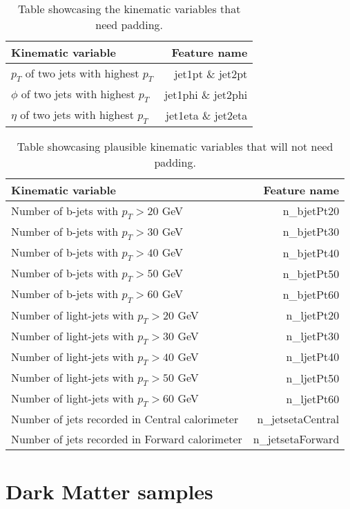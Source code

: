 \documentclass[14pt, a4paper]{book}
\begin{document}
\begin{table}[!h]
    \centering
    \begin{tabular}{l|r}\midrule\midrule
        Kinematic variable                                                  & Feature name          \\\midrule
        $p_T$ of two jets with highest $p_T$                                & jet1pt \& jet2pt\\
        $\phi$ of two jets with highest $p_T$                               & jet1phi \& jet2phi\\
        $\eta$ of two jets with highest $p_T$                               & jet1eta \& jet2eta\\
    \end{tabular}
    \caption[Kinematic variables that need padding]{Table showcasing the kinematic variables that need padding.}
    \label{tab:paddable_variables}
\end{table}

\begin{table}[!h]
    \centering
    \begin{tabular}{l|r}\midrule\midrule
        Kinematic variable                              & Feature name          \\\midrule
        Number of b-jets with $p_T > 20$ GeV            & n\_bjetPt20\\
        Number of b-jets with $p_T > 30$ GeV            & n\_bjetPt30\\
        Number of b-jets with $p_T > 40$ GeV            & n\_bjetPt40\\
        Number of b-jets with $p_T > 50$ GeV            & n\_bjetPt50\\
        Number of b-jets with $p_T > 60$ GeV            & n\_bjetPt60\\
        Number of light-jets with $p_T > 20$ GeV        & n\_ljetPt20\\
        Number of light-jets with $p_T > 30$ GeV        & n\_ljetPt30\\
        Number of light-jets with $p_T > 40$ GeV        & n\_ljetPt40\\
        Number of light-jets with $p_T > 50$ GeV        & n\_ljetPt50\\
        Number of light-jets with $p_T > 60$ GeV        & n\_ljetPt60\\
        Number of jets recorded in Central calorimeter  &n\_jetsetaCentral\\
        Number of jets recorded in Forward calorimeter  &n\_jetsetaForward\\\midrule\midrule
    \end{tabular}
    \caption[New kinematic variables that need no padding]{Table showcasing plausible kinematic variables that will not need padding.}
    \label{tab:paddable_variables}
\end{table}

\section{Dark Matter samples}
\end{document}

